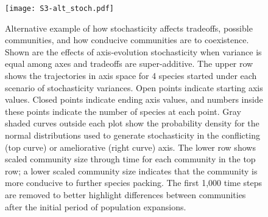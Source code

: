 \begin{figure}[ht!]
\centering
\texttt{[image: S3-alt\_stoch.pdf]}
\caption{Alternative example of how stochasticity affects tradeoffs, 
possible communities, and how conducive communities are to coexistence.
Shown are the effects of axis-evolution stochasticity when
variance is equal among axes and tradeoffs are super-additive.
The upper row shows the trajectories in axis space
for 4 species started under each scenario of stochasticity variances.
Open points indicate starting axis values.
Closed points indicate ending axis values, and 
numbers inside these points indicate the number of species at each point.
Gray shaded curves outside each plot show the probability density for
the normal distributions used to generate stochasticity in the
conflicting (top curve) or ameliorative (right curve) axis.
The lower row shows scaled community size through time for each community
in the top row;
a lower scaled community size indicates that the community is more 
conducive to further species packing.
The first 1,000 time steps are removed to better highlight differences
between communities after the initial period of population expansions.
}
\label{fig:alt-stochasticity}
\end{figure}

